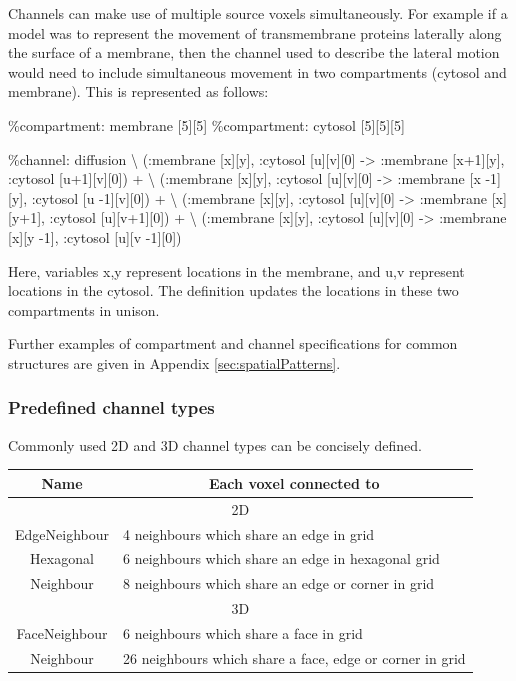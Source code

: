 Channels can make use of multiple source voxels simultaneously. For example if a model was to represent the movement of transmembrane proteins laterally along the surface of a membrane, then the channel used to describe the lateral motion would need to include simultaneous movement in two compartments (cytosol and membrane). This is represented as follows:

\begin{kappasource}
\%compartment: membrane [5][5]
\%compartment: cytosol [5][5][5]

\%channel: diffusion {\textbackslash}
    (:membrane [x][y], :cytosol [u][v][0] -> :membrane [x+1][y], :cytosol [u+1][v][0]) + {\textbackslash}
    (:membrane [x][y], :cytosol [u][v][0] -> :membrane [x -1][y], :cytosol [u -1][v][0]) + {\textbackslash}
    (:membrane [x][y], :cytosol [u][v][0] -> :membrane [x][y+1], :cytosol [u][v+1][0]) + {\textbackslash}
    (:membrane [x][y], :cytosol [u][v][0] -> :membrane [x][y -1], :cytosol [u][v -1][0])
\end{kappasource}

Here, variables x,y represent locations in the membrane, and u,v represent locations in the cytosol. The definition updates the locations in these two compartments in unison.

Further examples of compartment and channel specifications for common structures are given in Appendix
 \ref{sec:spatialPatterns}.

\subsubsection{Predefined channel types}

Commonly used 2D and 3D channel types can be concisely defined. 

\medskip 

\begin{tabular}{|c|l|}
\hline
Name & \multicolumn{1}{|c|}{Each voxel connected to}\\ 
\hline
\multicolumn{2}{|c|}{2D}\\
\hline
EdgeNeighbour & 4 neighbours which share an edge in grid \\
Hexagonal & 6 neighbours which share an edge in hexagonal grid \\
Neighbour & 8 neighbours which share an edge or corner in grid \\
\hline
\multicolumn{2}{|c|}{3D}\\
\hline
FaceNeighbour & 6 neighbours which share a face in grid\\
Neighbour & 26 neighbours which share a face, edge or corner in grid \\
\hline
\end{tabular} 

